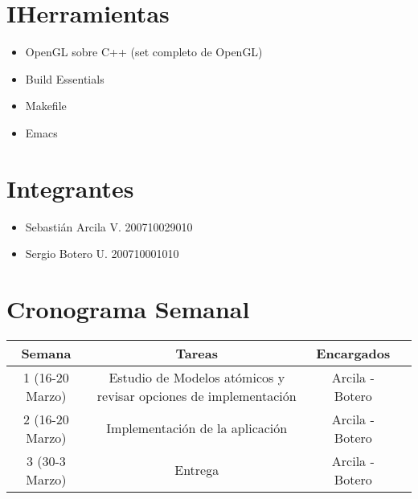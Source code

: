 \documentclass[]{article}
\begin{document}
\section{IHerramientas}
\begin{itemize}
\item  OpenGL sobre C++ (set completo de OpenGL)
\item Build Essentials
\item Makefile
\item Emacs
\end{itemize}
\section{Integrantes}
\begin{itemize}
\item Sebasti\'an Arcila V. 200710029010
\item Sergio Botero U. 200710001010
\end{itemize}
\section{Cronograma Semanal}


\begin{tabular}{cccc}
\hline
Semana & Tareas &  Encargados & \\
\hline
1 (16-20 Marzo) & Estudio de Modelos at\'omicos y revisar opciones de implementaci\'on & Arcila - Botero & \\
\hline
2 (16-20 Marzo) & Implementaci\'on de la aplicaci\'on & Arcila - Botero & \\
\hline
3 (30-3 Marzo) & Entrega & Arcila - Botero & \\
\hline
\end{tabular}




\end{document}
